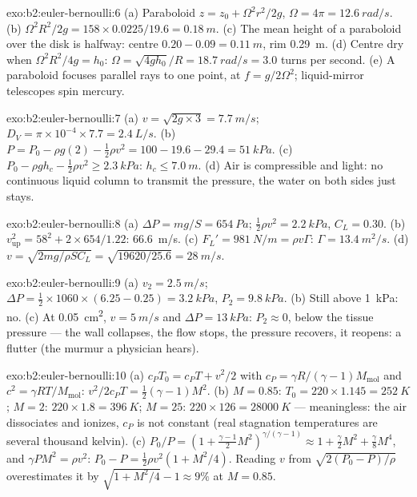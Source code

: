 \begin{solution}{exo:b2:euler-bernoulli:6}
(a) Paraboloid $z = z_0 + \Omega^2r^2/2g$, $\Omega = 4\pi = \qty{12.6}{rad/s}$. (b)
$\Omega^2R^2/2g = 158 \times 0.0225/19.6 = \qty{0.18}{m}$. (c) The mean height of a
paraboloid over the disk is halfway: centre $0.20 - 0.09 = \qty{0.11}{m}$, rim
\qty{0.29}{m}. (d) Centre dry when $\Omega^2R^2/4g = h_0$: $\Omega = \sqrt{4gh_0}/R =
\qty{18.7}{rad/s} = 3.0$ turns per second. (e) A paraboloid focuses
parallel rays to one point, at $f = g/2\Omega^2$; liquid-mirror telescopes
spin mercury.
\end{solution}

\begin{solution}{exo:b2:euler-bernoulli:7}
(a) $v = \sqrt{2g \times 3} = \qty{7.7}{m/s}$; $D_V = \pi \times 10^{-4} \times 7.7 =
\qty{2.4}{L/s}$. (b) $P = P_0 - \rho g(2) - \tfrac12\rho v^2 = 100 - 19.6 - 29.4 =
\qty{51}{kPa}$. (c) $P_0 - \rho gh_c - \tfrac12\rho v^2 \ge \qty{2.3}{kPa}$: $h_c \le
\qty{7.0}{m}$. (d) Air is compressible and light: no continuous liquid
column to transmit the pressure, the water on both sides just stays.
\end{solution}

\begin{solution}{exo:b2:euler-bernoulli:8}
(a) $\Delta P = mg/S = \qty{654}{Pa}$; $\tfrac12\rho v^2 = \qty{2.2}{kPa}$, $C_L = 0.30$.
(b) $v_{\text{up}}^2 = 58^2 + 2 \times 654/1.22$: \qty{66.6}{m/s}. (c) $F_L' =
\qty{981}{N/m} = \rho v\Gamma$: $\Gamma = \qty{13.4}{m^2/s}$. (d) $v = \sqrt{2mg/
\rho SC_L} = \sqrt{19620/25.6} = \qty{28}{m/s}$.
\end{solution}

\begin{solution}{exo:b2:euler-bernoulli:9}
(a) $v_2 = \qty{2.5}{m/s}$; $\Delta P = \tfrac12 \times 1060 \times (6.25 - 0.25) =
\qty{3.2}{kPa}$, $P_2 = \qty{9.8}{kPa}$. (b) Still above \qty{1}{kPa}: no. (c) At
\qty{0.05}{cm^2}, $v = \qty{5}{m/s}$ and $\Delta P = \qty{13}{kPa}$: $P_2 \approx 0$, below
the tissue pressure --- the wall collapses, the flow stops, the
pressure recovers, it reopens: a flutter (the murmur a physician hears).
\end{solution}

\begin{solution}{exo:b2:euler-bernoulli:10}
(a) $c_PT_0 = c_PT + v^2/2$ with $c_P = \gamma R/(\gamma - 1)M_{\text{mol}}$ and
$c^2 = \gamma RT/M_{\text{mol}}$: $v^2/2c_PT = \tfrac12(\gamma - 1)M^2$. (b) $M =
0.85$: $T_0 = 220 \times 1.145 = \qty{252}{K}$; $M = 2$: $220 \times 1.8 = \qty{396}{K}$;
$M = 25$: $220 \times 126 = \qty{28000}{K}$ --- meaningless: the air dissociates
and ionizes, $c_P$ is not constant (real stagnation temperatures are
several thousand kelvin). (c) $P_0/P = (1 + \tfrac{\gamma - 1}2M^2)^{\gamma/(\gamma
- 1)} \approx 1 + \tfrac{\gamma}2M^2 + \tfrac{\gamma}8M^4$, and $\gamma PM^2 = \rho v^2$:
$P_0 - P = \tfrac12\rho v^2(1 + M^2/4)$. Reading $v$ from $\sqrt{2(P_0 - P)/\rho}$
overestimates it by $\sqrt{1 + M^2/4} - 1 \approx 9\%$ at $M = 0.85$.
\end{solution}

